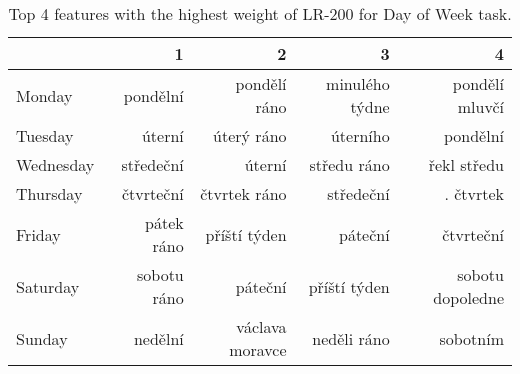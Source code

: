 \begin{table}
    \centering\footnotesize\sf
    \begin{tabular}{lrrrr}
        \toprule
        {} &            1 &                2 &               3 &                 4 \\
        \midrule
        Monday    &     pondělní &     pondělí ráno &  minulého týdne &    pondělí mluvčí \\
        Tuesday   &       úterní &       úterý ráno &        úterního &          pondělní \\
        Wednesday &    středeční &           úterní &     středu ráno &       řekl středu \\
        Thursday  &    čtvrteční &     čtvrtek ráno &       středeční &         . čtvrtek \\
        Friday    &   pátek ráno &     příští týden &         páteční &         čtvrteční \\
        Saturday  &  sobotu ráno &          páteční &    příští týden &  sobotu dopoledne \\
        Sunday    &      nedělní &  václava moravce &     neděli ráno &          sobotním \\
        \bottomrule
    \end{tabular}
    \caption{Top 4 features with the highest weight of LR-200 for Day of Week task.}
    \label{tab:top4_day_of_week}
\end{table}
